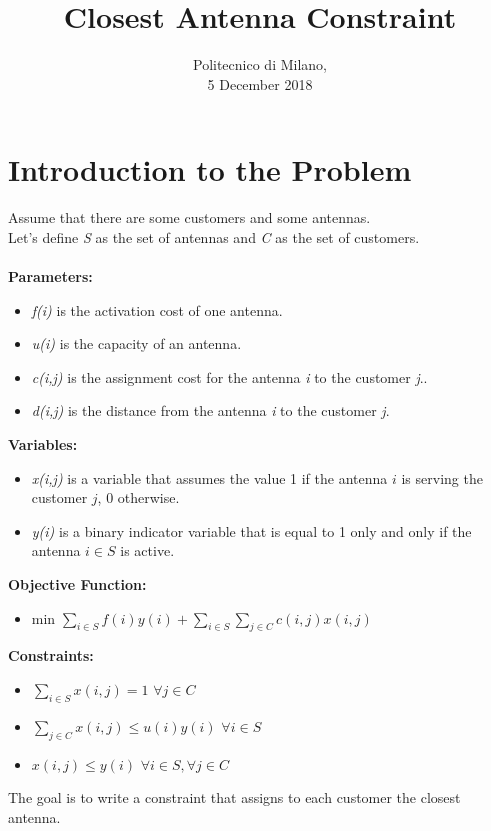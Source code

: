 \documentclass[1pt]{article}
\title{\huge \textrm{Closest Antenna Constraint}}
\date{\textrm{Politecnico di Milano, \\5 December 2018}}
\begin{document}
	\begin{titlepage}
		\maketitle
	\end{titlepage}


	\newpage
	\section{Introduction to the Problem}
		Assume that there are some customers and some antennas.\\ Let's define \emph{S} as the set of antennas and \emph{C} as the set of customers.\\\\
		\textbf{Parameters:}
		\begin{itemize}
			\item \emph{f(i)} is the activation cost of one antenna.
			\item \emph{u(i)} is the capacity of an antenna. 
			\item \emph{c(i,j)} is the assignment cost for the antenna \emph{i} to the customer \emph{j}..
			\item \emph{d(i,j)} is the distance from the antenna \emph{i} to the customer \emph{j}.
		\end{itemize}
		\textbf{Variables:}
		\begin{itemize}	
			\item \emph{x(i,j)} is a variable that assumes the value 1 if the antenna $i$ is serving the customer $j$, 0 otherwise.
			\item \emph{y(i)} is a binary indicator variable that is equal to 1 only and only if the antenna $i \in S$ is active.
		\end{itemize}
		\textbf{Objective Function:}
		\begin{itemize}
			\item min $\sum_{i \in S} f(i) y(i) + \sum_{i \in S} \sum_{j \in C} c(i,j) x(i,j)$
		\end{itemize}
		\textbf{Constraints:}
		\begin{itemize}
			\item $\sum_{i \in S} x(i,j) = 1$ $\forall j \in C$
			\item $\sum_{j \in C} x(i,j) \leqslant u(i)y(i)$ $\forall i \in S$
			\item $x(i,j) \leq y(i)$ $\forall i \in S, \forall j \in C$
		\end{itemize}
		The goal is to write a constraint that assigns to each customer the closest antenna.
\end{document}
